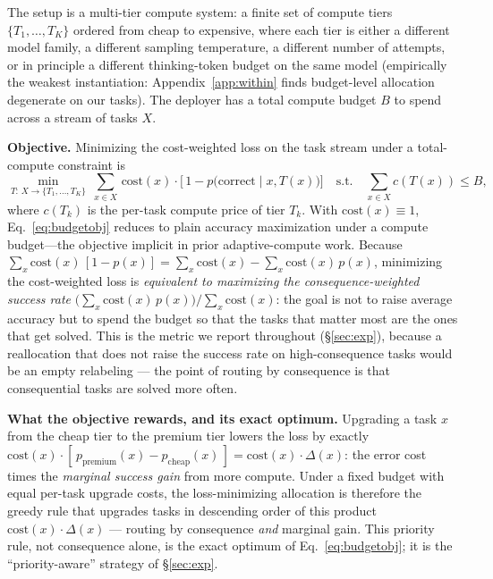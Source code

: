 \documentclass{article}
\begin{document}
The setup is a multi-tier compute system: a finite set of compute tiers $\{T_1, \ldots, T_K\}$ ordered from cheap to expensive, where each tier is either a different model family, a different sampling temperature, a different number of attempts, or in principle a different thinking-token budget on the same model (empirically the weakest instantiation: Appendix~\ref{app:within} finds budget-level allocation degenerate on our tasks). The deployer has a total compute budget $B$ to spend across a stream of tasks $X$.

\textbf{Objective.} Minimizing the cost-weighted loss on the task stream under a total-compute constraint is
\begin{equation}\label{eq:budgetobj}
\min_{T:\,X\to\{T_1,\dots,T_K\}}\ \sum_{x\in X}\, \mathrm{cost}(x)\cdot
\bigl[\,1 - p\bigl(\text{correct}\mid x, T(x)\bigr)\bigr]
\quad\text{s.t.}\quad
\sum_{x\in X} c(T(x)) \leq B,
\end{equation}
where $c(T_k)$ is the per-task compute price of tier $T_k$. With
$\mathrm{cost}(x){\equiv}1$, Eq.~\ref{eq:budgetobj} reduces to plain
accuracy maximization under a compute budget---the objective implicit in prior adaptive-compute work.
Because $\sum_x \mathrm{cost}(x)\,[1-p(x)] = \sum_x \mathrm{cost}(x) -
\sum_x \mathrm{cost}(x)\,p(x)$, minimizing the cost-weighted loss is
\emph{equivalent to maximizing the consequence-weighted success rate}
$\big(\sum_x \mathrm{cost}(x)\,p(x)\big)/\sum_x \mathrm{cost}(x)$: the
goal is not to raise average accuracy but to spend the budget so that
the tasks that matter most are the ones that get solved. This is the
metric we report throughout (\S\ref{sec:exp}), because a reallocation
that does not raise the success rate on high-consequence tasks would
be an empty relabeling --- the point of routing by consequence is that
consequential tasks are solved more often.

\textbf{What the objective rewards, and its exact optimum.} Upgrading
a task $x$ from the cheap tier to the premium tier lowers the loss by
exactly $\mathrm{cost}(x)\cdot[\,p_{\mathrm{premium}}(x) -
p_{\mathrm{cheap}}(x)\,] = \mathrm{cost}(x)\cdot\Delta(x)$: the error
cost times the \emph{marginal success gain} from more compute. Under a
fixed budget with equal per-task upgrade costs, the loss-minimizing
allocation is therefore the greedy rule that upgrades tasks in
descending order of this product $\mathrm{cost}(x)\cdot\Delta(x)$ ---
routing by consequence \emph{and} marginal gain. This priority rule,
not consequence alone, is the exact optimum of
Eq.~\ref{eq:budgetobj}; it is the ``priority-aware'' strategy of
\S\ref{sec:exp}.
\end{document}
